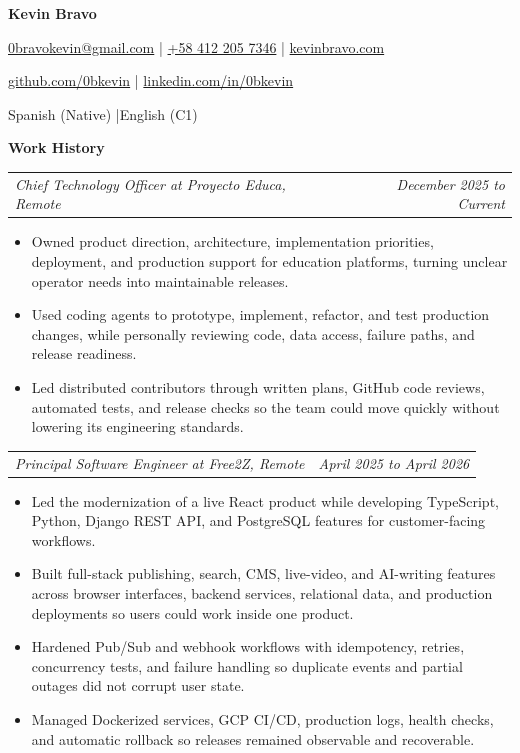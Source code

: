 \documentclass[10pt,letterpaper]{article}
\makeatletter
\newcommand{\bodyfont}{\fontsize{10.5}{15.75}\selectfont}
\newcommand{\contactfont}{\fontsize{12}{15}\selectfont}
\newcommand{\sectiontitle}[1]{%
  \vspace{4pt}
  {\bodyfont\textbf{#1}}\par
  \nopagebreak[4]
  \vspace{2pt}
}
\newcommand{\roleline}[2]{%
  \begin{tabularx}{\textwidth}{@{}Xr@{}}
    \bodyfont\textit{#1} & \bodyfont\textit{#2}
  \end{tabularx}
  \nopagebreak[4]
  \vspace{1pt}
}
\makeatother
\begin{document}
\bodyfont
\raggedright

\begin{center}
  {\fontsize{14}{17}\selectfont\textbf{Kevin Bravo}}\par
  \vspace{3pt}
  {\contactfont
    \href{mailto:0bravokevin@gmail.com}{0bravokevin@gmail.com}
    \enspace|\enspace
    \href{tel:+584122057346}{+58 412 205 7346}
    \enspace|\enspace
    \href{https://kevinbravo.com}{kevinbravo.com}
  }\par
  {\contactfont
    \href{https://github.com/0bkevin}{github.com/0bkevin}
    \enspace|\enspace
    \href{https://www.linkedin.com/in/0bkevin/}{linkedin.com/in/0bkevin}
  }\par
  {\contactfont Spanish (Native) \enspace|\enspace English (C1)}
\end{center}

\sectiontitle{Work History}

\roleline{Chief Technology Officer at Proyecto Educa, Remote}{December 2025 to Current}
\begin{itemize}
  \item Owned product direction, architecture, implementation priorities, deployment, and production support for education platforms, turning unclear operator needs into maintainable releases.
  \item Used coding agents to prototype, implement, refactor, and test production changes, while personally reviewing code, data access, failure paths, and release readiness.
  \item Led distributed contributors through written plans, GitHub code reviews, automated tests, and release checks so the team could move quickly without lowering its engineering standards.
\end{itemize}

\vspace{3pt}
\roleline{Principal Software Engineer at Free2Z, Remote}{April 2025 to April 2026}
\begin{itemize}
  \item Led the modernization of a live React product while developing TypeScript, Python, Django REST API, and PostgreSQL features for customer-facing workflows.
  \item Built full-stack publishing, search, CMS, live-video, and AI-writing features across browser interfaces, backend services, relational data, and production deployments so users could work inside one product.
  \item Hardened Pub/Sub and webhook workflows with idempotency, retries, concurrency tests, and failure handling so duplicate events and partial outages did not corrupt user state.
  \item Managed Dockerized services, GCP CI/CD, production logs, health checks, and automatic rollback so releases remained observable and recoverable.
\end{itemize}
\end{document}
